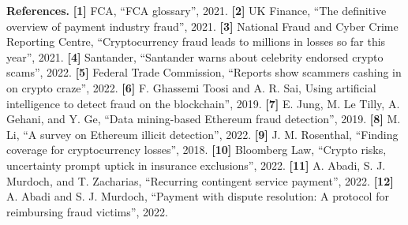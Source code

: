 


%

\vspace{1mm}

\noindent\textbf{\large{References.}}
%
\textbf{[1]} FCA, ``FCA glossary'', 2021.
%
\textbf{[2]}  UK Finance, ``The definitive overview of payment industry fraud'', 2021.
%
\textbf{[3]} National Fraud and Cyber Crime Reporting Centre, ``Cryptocurrency fraud leads to millions in losses so far this year'', 2021.
%
\textbf{[4]} Santander, ``Santander warns about celebrity endorsed crypto scams'', 2022.
%
%
\textbf{[5]}  Federal Trade Commission, ``Reports show scammers cashing in on crypto craze'', 2022.
%
%
\textbf{[6]}  F. Ghassemi Toosi and A. R. Sai, Using artificial intelligence to detect fraud on the blockchain'', 2019.
%
%
\textbf{[7]}   E. Jung, M. Le Tilly, A. Gehani, and Y. Ge, ``Data mining-based Ethereum fraud detection'', 2019.
%
\textbf{[8]}   M. Li, ``A survey on Ethereum illicit detection'', 2022. 
%
%
\textbf{[9]}  J. M. Rosenthal, ``Finding coverage for cryptocurrency losses'', 2018. 
%
%
\textbf{[10]}  Bloomberg Law, ``Crypto risks, uncertainty prompt uptick in insurance exclusions'', 2022.
%
%
\textbf{[11]}   A. Abadi, S. J. Murdoch, and T. Zacharias, ``Recurring contingent service payment'', 2022. 
%
\textbf{[12]}  A. Abadi and S. J. Murdoch, ``Payment with dispute resolution: A protocol for reimbursing fraud victims'', 2022.
